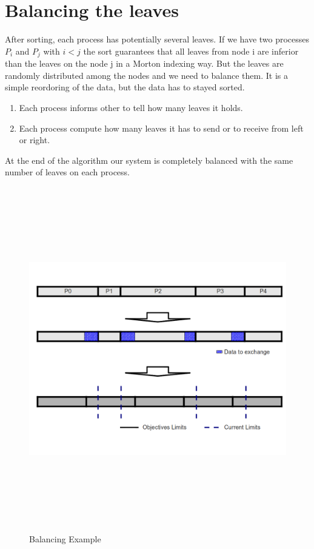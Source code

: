 \documentclass[12pt,letterpaper,titlepage]{report}
\begin{document}
\section{Balancing the leaves}
After sorting, each process has potentially several leaves.
If we have two processes $P_{i}$ and $P_{j}$ with $i < j$ the sort guarantees that all leaves from node i are inferior than the leaves on the node j in a Morton indexing way.
But the leaves are randomly distributed among the nodes and we need to balance them.
It is a simple reordoring of the data, but the data has to stayed sorted.

\begin{enumerate}
\item Each process informs other to tell how many leaves it holds.
\item Each process compute how many leaves it has to send or to receive from left or right.
\end{enumerate}
At the end of the algorithm our system is completely balanced with the same number of leaves on each process.

\begin{figure}[h!]
\begin{center}
\includegraphics[width=15cm, height=15cm, keepaspectratio=true]{Balance.png}
\caption{Balancing Example}
\end{center}
\end{figure}
\end{document}
